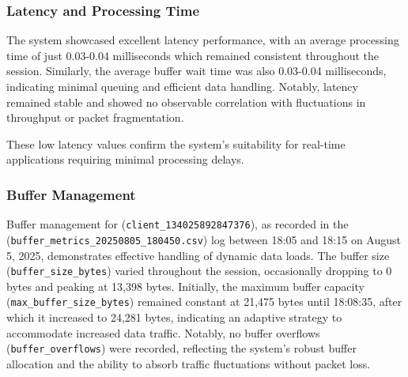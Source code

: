 \subsubsection{Latency and Processing Time}
The system showcased excellent latency performance, with an average processing time of just 0.03-0.04 milliseconds which remained consistent throughout the session. Similarly, the average buffer wait time was also 0.03-0.04 milliseconds, indicating minimal queuing and efficient data handling. Notably, latency remained stable and showed no observable correlation with fluctuations in throughput or packet fragmentation.

These low latency values confirm the system's suitability for real-time applications requiring minimal processing delays.

\subsubsection{Buffer Management}
Buffer management for (\texttt{client\_134025892847376}), as recorded in the (\texttt{buffer\_metrics\allowbreak{}\_20250805\_180450.csv}) log between 18:05 and 18:15 on August 5, 2025, demonstrates effective handling of dynamic data loads. The buffer size (\texttt{buffer\_size\_bytes}) varied throughout the session, occasionally dropping to 0 bytes and peaking at 13{,}398 bytes. Initially, the maximum buffer capacity (\texttt{max\_buffer\_size\_bytes}) remained constant at 21{,}475 bytes until 18:08:35, after which it increased to 24{,}281 bytes, indicating an adaptive strategy to accommodate increased data traffic. Notably, no buffer overflows (\texttt{buffer\_overflows}) were recorded, reflecting the system’s robust buffer allocation and the ability to absorb traffic fluctuations without packet loss.

